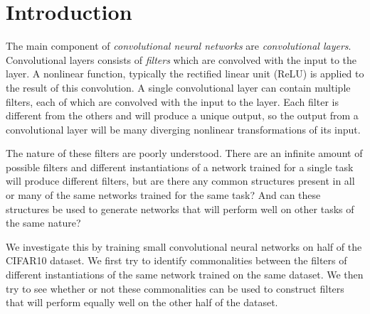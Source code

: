 \section{Introduction}

The main component of \textit{convolutional neural networks} are \textit{convolutional layers}. Convolutional layers consists of \textit{filters} which are convolved with the input to the layer.
A nonlinear function, typically the rectified linear unit (ReLU) is applied to the result of this convolution.
A single convolutional layer can contain multiple filters, each of which are convolved with the input to the layer.
Each filter is different from the others and will produce a unique output, so the output from a convolutional layer will be many diverging nonlinear transformations of its input.

The nature of these filters are poorly understood.
There are an infinite amount of possible filters and different instantiations of a network trained for a single task will produce different filters, but are there any common structures present in all or many of the same networks trained for the same task?
And can these structures be used to generate networks that will perform well on other tasks of the same nature?

We investigate this by training small convolutional neural networks on half of the CIFAR10 dataset.
We first try to identify commonalities between the filters of different instantiations of the same network trained on the same dataset. We then try to see whether or not these commonalities can be used to construct filters that will perform equally well on the other half of the dataset.
















